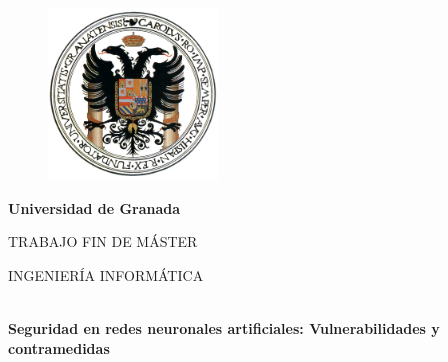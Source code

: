 \documentclass[
11pt, %
spanish, %
singlespacing, %
headsepline, %
]{MastersDoctoralThesis} %
\author{Rodrigo Orellana Flores} %
\begin{document}
\frontmatter %

\pagestyle{plain} %


\begin{titlepage}
\begin{center}

\begin{figure}
\centering
\includegraphics[width=0.4\textwidth]{Figures/ugr3.png} %
\end{figure}
{\huge \bfseries Universidad de Granada\par}\vspace{0.4cm} %
{\normalsize \facname \par}%

\vspace*{.06\textheight}





{\scshape\LARGE TRABAJO FIN DE MÁSTER\par}\vspace{0.5cm}  
\textsc{\Large INGENIERÍA INFORMÁTICA}\\[0.5cm] 

\HRule \\[0.4cm] %
{\huge \bfseries Seguridad en redes neuronales artificiales: Vulnerabilidades y contramedidas\par}\vspace{0.4cm} %
\HRule \\[1.5cm] %
 

\end{center}
\end{titlepage}
\end{document}
